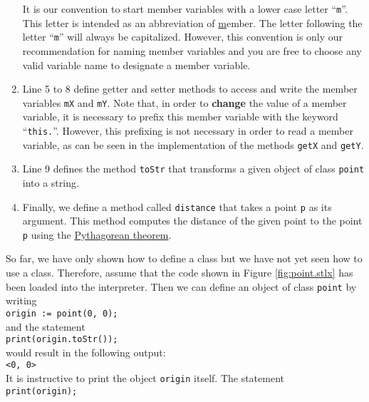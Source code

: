 \begin{enumerate}
      It is our convention to start member variables with a lower case letter ``\texttt{m}''.  This
      letter is intended as an abbreviation of \underline{m}ember.  The letter following the letter
      ``\texttt{m}'' will always be capitalized.  However, this convention is only our
      recommendation for naming member variables and you are free to choose any valid variable name
      to designate a member variable.
\item Line 5 to 8 define getter and setter methods to access and write the member variables
      \texttt{mX} and \texttt{mY}.  Note that, in order to \textbf{change} the value of a member variable, it
      is necessary to prefix this member variable with the keyword ``\texttt{this.}''.  However, this prefixing is not
      necessary in order to read a member variable, as can be seen in the implementation of the
      methods \texttt{getX} and \texttt{getY}.
\item Line 9 defines the method \texttt{toStr} that transforms a given object of class
      \texttt{point} into a string.
\item Finally, we define a method called \texttt{distance} that takes a point \texttt{p} as its
      argument.  This method computes the distance of the given point to the point \texttt{p}
      using the \href{http://en.wikipedia.org/wiki/Pythagorean_theorem}{Pythagorean theorem}.
\end{enumerate}
So far, we have only shown how to define a class but we have not yet seen how to use a class.
Therefore, assume that the code shown in Figure \ref{fig:point.stlx} has been loaded into the
interpreter.   Then we can define an object of class \texttt{point} by writing
\\[0.2cm]
\hspace*{1.3cm}
\texttt{origin := point(0, 0);}
\\[0.2cm]
and the statement
\\[0.2cm]
\hspace*{1.3cm}
\texttt{print(origin.toStr());}
\\[0.2cm] 
would result in the following output:
\\[0.2cm]
\hspace*{1.3cm}
\texttt{<0, 0>}
\\[0.2cm]
It is instructive to print the object \texttt{origin} itself.  The statement 
\\[0.2cm]
\hspace*{1.3cm}
\texttt{print(origin);}
\\[0.2cm]
